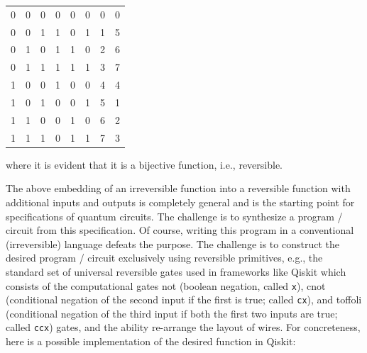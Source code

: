 \begin{center}\begin{tabular}{|ccc|ccc|@{\qquad\qquad}|c|c|}
0 & 0 & 0 &     0 & 0 & 0     & 0 & 0 \\
0 & 0 & 1 &     1 & 0 & 1     & 1 & 5 \\
0 & 1 & 0 &     1 & 1 & 0    & 2 & 6 \\
0 & 1 & 1 &     1 & 1 & 1    & 3 & 7 \\
1 & 0 & 0 &     1 & 0 & 0    & 4 & 4 \\
1 & 0 & 1 &     0 & 0 & 1    & 5 & 1 \\
1 & 1 & 0 &     0 & 1 & 0    & 6 & 2 \\
1 & 1 & 1 &     0 & 1 & 1    & 7 & 3
\end{tabular}\end{center}

\noindent where it is evident that it is a bijective function, i.e., reversible.

The above embedding of an irreversible function into a reversible function with additional inputs and outputs is
completely general and is the starting point for specifications of quantum circuits. The challenge is to synthesize a
program / circuit from this specification. Of course, writing this program in a conventional (irreversible) language
defeats the purpose. The challenge is to construct the desired program / circuit exclusively using reversible
primitives, e.g., the standard set of universal reversible gates used in frameworks like Qiskit which consists of the
computational gates \textsf{not} (boolean negation, called \verb|x|), \textsf{cnot} (conditional negation of the second
input if the first is true; called \verb|cx|), and \textsf{toffoli} (conditional negation of the third input if both the
first two inputs are true; called \verb|ccx|) gates, and the ability re-arrange the layout of wires. For concreteness,
here is a possible implementation of the desired function in Qiskit:

